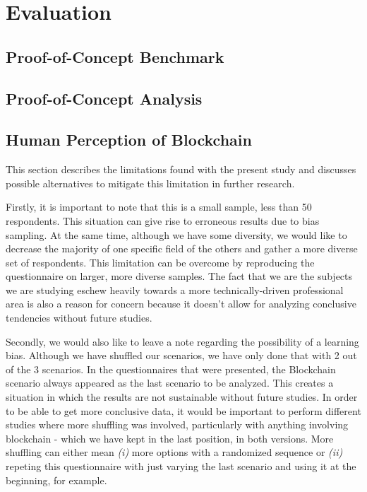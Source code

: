\chapter{Evaluation}
\label{chap:evaluation}

\section{Proof-of-Concept Benchmark}
\label{sec:eval-benchmark}

\section{Proof-of-Concept Analysis}

\section{Human Perception of Blockchain}

This section describes the limitations found with the present study and discusses possible alternatives to mitigate this limitation in further research.

Firstly, it is important to note that this is a small sample, less than 50 respondents. This situation can give rise to erroneous results due to bias sampling. At the same time, although we have some diversity, we would like to decrease the majority of one specific field of the others and gather a more diverse set of respondents. This limitation can be overcome by reproducing the questionnaire on larger, more diverse samples. The fact that we are the subjects we are studying eschew heavily towards a more technically-driven professional area is also a reason for concern because it doesn't allow for analyzing conclusive tendencies without future studies.

Secondly, we would also like to leave a note regarding the possibility of a learning bias. Although we have shuffled our scenarios, we have only done that with 2 out of the 3 scenarios. In the questionnaires that were presented, the Blockchain scenario always appeared as the last scenario to be analyzed. This creates a situation in which the results are not sustainable without future studies. In order to be able to get more conclusive data, it would be important to perform different studies where more shuffling was involved, particularly with anything involving blockchain - which we have kept in the last position, in both versions. More shuffling can either mean \textit{(i)} more options with a randomized sequence or \textit{(ii)} repeting this questionnaire with just varying the last scenario and using it at the beginning, for example.

